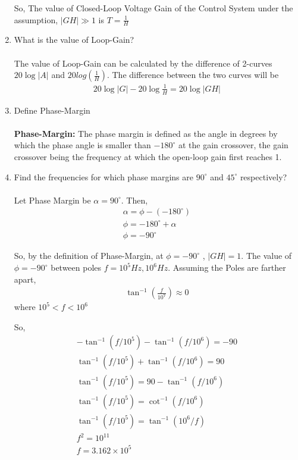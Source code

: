 \begin{enumerate}[label=\thesubsection.\arabic*.,ref=\thesubsection.\theenumi]
So, The value of Closed-Loop Voltage Gain of the Control System under the assumption, $|GH| \gg 1$ is $T = \frac{1}{H}$\\
\item What is the value of Loop-Gain?\\
\solution\\
The value of Loop-Gain can be calculated by the difference of 2-curves $20\log|A|$ and $20log(\frac{1}{H})$. The difference between the two curves will be
\begin{align}
20 \log |G|-20 \log \frac{1}{H}=20 \log |GH|
\end{align}
\item Define Phase-Margin\\
\solution\\
\textbf{Phase-Margin:} The phase margin is defined as the angle in degrees by which the phase angle is smaller than $-180^{\circ}$ at the gain crossover, the gain crossover being the frequency at which the open-loop gain first reaches 1. \\
\item Find the frequencies for which phase margins are $90^{\circ}$ and $45^{\circ}$ respectively?\\
\solution\\
Let Phase Margin be $\alpha = 90^{\circ}$. Then,
\begin{align}
\alpha = \phi - (-180^{\circ})\\
\phi = -180^{\circ} + \alpha\\
\phi = -90^{\circ}
\end{align}

So, by the definition of Phase-Margin, at $\phi = -90^{\circ}$ , $|GH| = 1 $.  The value of $\phi = -90^{\circ}$ between poles $f=10^{5}Hz,10^{6}Hz$. Assuming the Poles are farther apart, 
\begin{align}
\tan^{-1}(\frac{f}{10^{7}}) \approx 0
\end{align}
where $10^{5} < f < 10^{6}$

So,
\begin{align}
-\tan^{-1}\left(f/10^{5}\right)-\tan^{-1}\left(f/10^{6}\right) = -90\\
\tan^{-1}\left(f/10^{5}\right)+\tan^{-1}\left(f/10^{6}\right) = 90\\
\tan^{-1}\left(f/10^{5}\right) = 90-\tan^{-1}\left(f/10^{6}\right)\\
\tan^{-1}\left(f/10^{5}\right) = \cot^{-1}\left(f/10^{6}\right)\\
\tan^{-1}\left(f/10^{5}\right) = \tan^{-1}\left(10^{6}/f\right)\\
f^{2} = 10^{11}\\
f = 3.162 \times 10^{5}
\end{align}


\end{enumerate}
